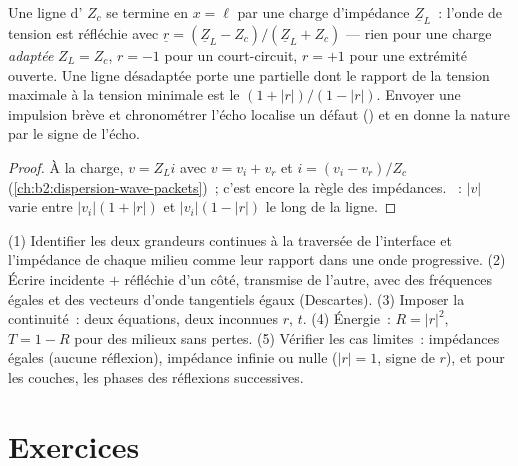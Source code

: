 \begin{proposition}\label{prop:b2:wave-interfaces:coax}
Une ligne d' $Z_c$ se termine en $x = \ell$ par une charge
d'impédance $\underline Z_L$~: l'onde de tension est réfléchie avec $\underline r =
(\underline Z_L - Z_c)/(\underline Z_L + Z_c)$ --- rien pour une charge \emph{adaptée}
$Z_L = Z_c$, $r = -1$ pour un court-circuit, $r = +1$ pour une extrémité ouverte. Une
ligne désadaptée porte une  partielle dont le rapport de la tension maximale
à la tension minimale est le \emph{} $(1 + |r|)/(1 - |r|)$.
Envoyer une impulsion brève et chronométrer l'écho localise un défaut () et en donne la nature par le signe de l'écho.
\end{proposition}

\begin{proof}
À la charge, $v = Z_Li$ avec $v = v_i + v_r$ et $i = (v_i - v_r)/Z_c$
(\cref{ch:b2:dispersion-wave-packets})~; c'est encore la règle des impédances.
~: $|v|$ varie entre $|v_i|(1 + |r|)$ et $|v_i|(1 -
|r|)$ le long de la ligne.
\end{proof}

\begin{method}\label{met:b2:wave-interfaces:method}
(1) Identifier les deux grandeurs continues à la traversée de l'interface et
l'impédance de chaque milieu comme leur rapport dans une onde progressive.
(2) Écrire incidente $+$ réfléchie d'un côté, transmise de l'autre,
avec des fréquences égales et des vecteurs d'onde tangentiels égaux (Descartes).
(3) Imposer la continuité~: deux équations, deux inconnues $r$, $t$. (4) Énergie~:
$R = |r|^2$, $T = 1 - R$ pour des milieux sans pertes. (5) Vérifier les cas limites~: impédances
égales (aucune réflexion), impédance infinie ou nulle ($|r| = 1$, signe
de $r$), et pour les couches, les phases des réflexions successives.
\end{method}

\section{Exercices}


